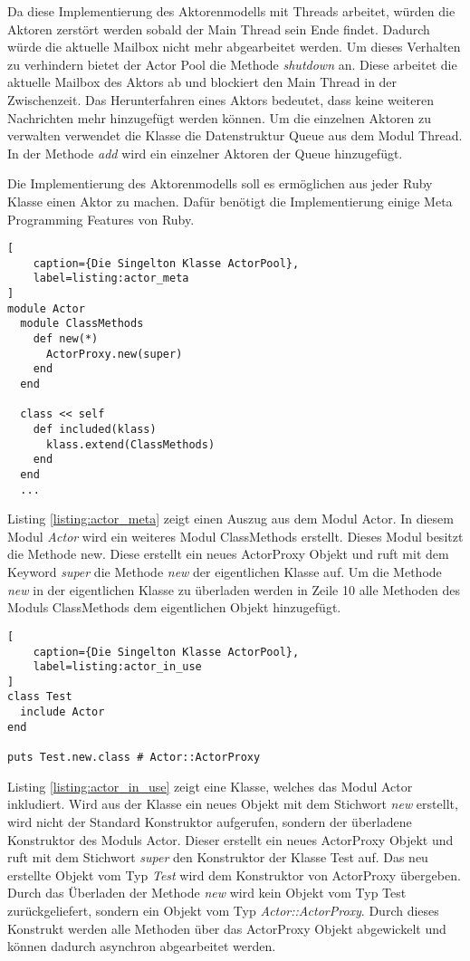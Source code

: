 Da diese Implementierung des Aktorenmodells mit Threads arbeitet, würden die Aktoren zerstört werden sobald der Main Thread sein Ende findet. Dadurch würde die aktuelle Mailbox nicht mehr abgearbeitet werden. Um dieses Verhalten zu verhindern bietet der Actor Pool die Methode \emph{shutdown} an. Diese arbeitet die aktuelle Mailbox des Aktors ab und blockiert den Main Thread in der Zwischenzeit. Das Herunterfahren eines Aktors bedeutet, dass keine weiteren Nachrichten mehr hinzugefügt werden können. Um die einzelnen Aktoren zu verwalten verwendet die Klasse die Datenstruktur Queue aus dem Modul Thread. In der Methode \emph{add} wird ein einzelner Aktoren der Queue hinzugefügt. 

Die Implementierung des Aktorenmodells soll es ermöglichen aus jeder Ruby Klasse einen Aktor zu machen. Dafür benötigt die Implementierung einige Meta Programming Features von Ruby. 

\begin{lstlisting}[
	caption={Die Singelton Klasse ActorPool},
	label=listing:actor_meta
]
module Actor
  module ClassMethods
    def new(*)
      ActorProxy.new(super)
    end
  end

  class << self
    def included(klass)
      klass.extend(ClassMethods)
    end
  end
  ...
\end{lstlisting}


Listing \ref{listing:actor_meta} zeigt einen Auszug aus dem Modul Actor. In diesem Modul \emph{Actor} wird ein weiteres Modul ClassMethods erstellt. Dieses Modul besitzt die Methode new. Diese erstellt ein neues ActorProxy Objekt und ruft mit dem Keyword \emph{super} die Methode \emph{new} der eigentlichen Klasse auf. Um die Methode \emph{new} in der eigentlichen Klasse zu überladen werden in Zeile 10 alle Methoden des Moduls ClassMethods dem eigentlichen Objekt hinzugefügt. 

\begin{lstlisting}[
	caption={Die Singelton Klasse ActorPool},
	label=listing:actor_in_use
]
class Test
  include Actor
end

puts Test.new.class # Actor::ActorProxy
\end{lstlisting}

Listing \ref{listing:actor_in_use} zeigt eine Klasse, welches das Modul Actor inkludiert.  Wird aus der Klasse ein neues Objekt mit dem Stichwort \emph{new} erstellt, wird nicht der Standard Konstruktor aufgerufen, sondern der überladene Konstruktor des Moduls Actor. Dieser erstellt ein neues ActorProxy Objekt und ruft mit dem Stichwort \emph{super} den Konstruktor der Klasse Test auf. Das neu erstellte Objekt vom Typ \emph{Test} wird dem Konstruktor von ActorProxy übergeben. Durch das Überladen der Methode \emph{new} wird kein Objekt vom Typ Test zurückgeliefert, sondern ein Objekt vom Typ \emph{Actor::ActorProxy}. Durch dieses Konstrukt 
werden alle Methoden über das ActorProxy Objekt abgewickelt und können dadurch asynchron abgearbeitet werden.

